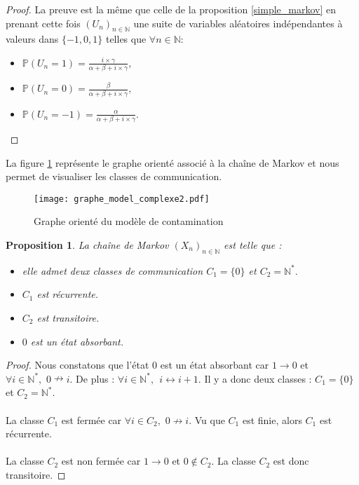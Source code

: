 \documentclass[12pt,a4paper]{report}
\newtheorem{prop}[thm]{Proposition}
\theoremstyle{remark}
\begin{document}
\begin{proof}
La preuve est la même que celle de la proposition \ref{simple_markov} en prenant cette fois $(U_n)_{n\in \mathbb{N}}$ une suite de variables aléatoires indépendantes à valeurs dans $\{-1, 0, 1\}$ telles que $\forall n \in \mathbb{N}$: \\
\begin{itemize}
    \item $\mathbb{P}(U_n=1)= \frac{i \times \gamma}{\alpha+\beta+i \times \gamma},$
    \item $\mathbb{P}(U_n=0)= \frac{\beta}{\alpha+\beta+i \times \gamma},$
    \item $\mathbb{P}(U_n=-1)= \frac{\alpha}{\alpha+\beta+i \times \gamma}.$
\end{itemize}
\end{proof}

La figure \ref{fig:my_label2} représente le graphe orienté associé à la chaîne de Markov et nous permet de visualiser les classes de communication.

\begin{figure}[h]
    \centering
\texttt{[image: graphe\_model\_complexe2.pdf]} 
\caption{Graphe orienté du modèle de contamination}
    \label{fig:my_label2}
\end{figure}

\begin{prop}
La chaîne de Markov $(X_n)_{n \in \mathbb{N}}$ est telle que :
\begin{itemize}
    \item elle admet deux classes de communication $C_1=\{0\}$ et $C_2=\mathbb{N}^*.$
    \item $C_1$ est récurrente.
    \item $C_2$ est transitoire.
    \item $0$ est un état absorbant.
\end{itemize}
\end{prop}
\begin{proof}
Nous constatons que l'état $0$ est un état absorbant car $1 \longrightarrow 0$ et $\forall i \in \mathbb{N}^*, \, \, 0 \nrightarrow i$. De plus : $\forall i \in \mathbb{N}^*,\ \  i \longleftrightarrow i+1$. Il y a donc deux classes : $C_1=\{0\}$ et $C_2=\mathbb{N}^*.$
\\
\\
La classe $C_1$ est fermée car $\forall i \in C_2, \, \, 0 \nrightarrow i$. Vu que $C_1$ est finie, alors $C_1$ est récurrente.
\\
\\
La classe $C_2$ est non fermée car $1 \rightarrow 0$ et $0 \notin C_2$. La classe $C_2$ est donc transitoire.
\end{proof}
\end{document}
